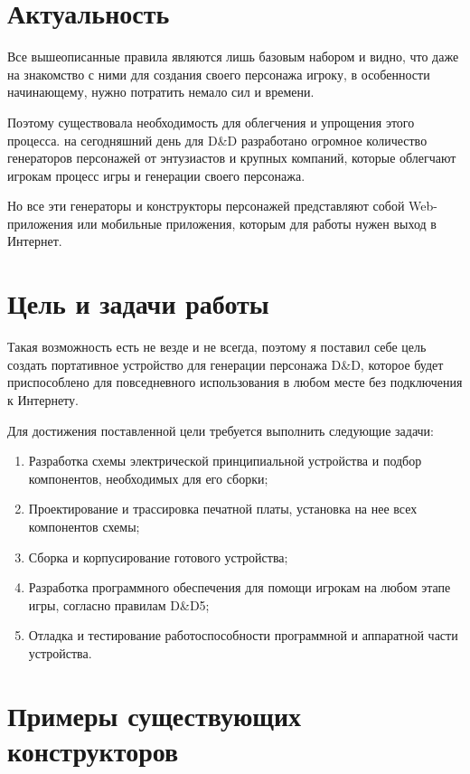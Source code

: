 \documentclass[12pt,a4paper]{article}
\begin{document}
\section{Актуальность}

Все вышеописанные правила являются лишь базовым набором и видно, что даже на знакомство с ними для создания своего персонажа игроку, в особенности начинающему, нужно потратить немало сил и времени.

Поэтому существовала необходимость для облегчения и упрощения этого процесса. на сегодняшний день для D\&D разработано огромное количество генераторов персонажей от энтузиастов и крупных компаний, которые облегчают игрокам процесс игры и генерации своего персонажа.

Но все эти генераторы и конструкторы персонажей представляют собой Web-приложения или мобильные приложения, которым для работы нужен выход в Интернет.

\section{Цель и задачи работы}

Такая возможность есть не везде и не всегда, поэтому я поставил себе цель создать портативное устройство для генерации персонажа D\&D, которое будет приспособлено для повседневного использования в любом месте без подключения к Интернету.

Для достижения поставленной цели требуется выполнить следующие задачи:

\begin{enumerate}
    \item Разработка схемы электрической принципиальной устройства и подбор компонентов, необходимых для его сборки;

    \item Проектирование и трассировка печатной платы, установка на нее всех компонентов схемы;

    \item Сборка и корпусирование готового устройства;

    \item Разработка программного обеспечения для помощи игрокам на любом этапе игры, согласно правилам D\&D5;

    \item Отладка и тестирование работоспособности программной и аппаратной части устройства.
\end{enumerate}

\section{Примеры существующих конструкторов}
\end{document}
